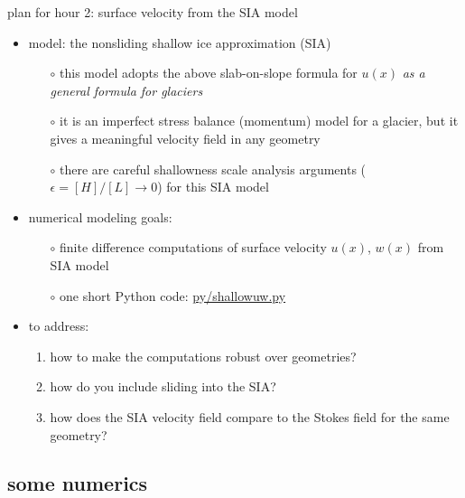 \documentclass[10pt,dvipsnames]{beamer}
\newcommand{\eps}{\epsilon}
\begin{document}
\begin{frame}{plan for hour 2: surface velocity from the SIA model}

\begin{itemize}
\item \alert{model:} the nonsliding shallow ice approximation (SIA)
  \begin{itemize}
  \item[$\circ$] this model adopts the above slab-on-slope formula for $u(x)$ \emph{as a general formula for glaciers}
  \item[$\circ$] it is an imperfect stress balance (momentum) model for a glacier, but it gives a meaningful velocity field in any geometry
  \item[$\circ$] there are careful shallowness scale analysis arguments ($\eps = [H]/[L] \to 0$) for this SIA model \cite{Fowler1997}
  \end{itemize}
\item \alert{numerical modeling goals:}
  \begin{itemize}
  \item[$\circ$] finite difference computations of surface velocity $u(x)$, $w(x)$ from SIA model
  \item[$\circ$] one short Python code: \quad \href{https://github.com/bueler/mccarthy/blob/master/py/shallowuw.py}{py/shallowuw.py}
  \end{itemize}
\item \alert{to address:}
     \begin{enumerate}
     \item how to make the computations robust over geometries?
     \item how do you include sliding into the SIA?
     \item how does the SIA velocity field compare to the Stokes field for the same geometry?
     \end{enumerate}
\end{itemize}
\end{frame}


\subsection{some numerics}
\end{document}
